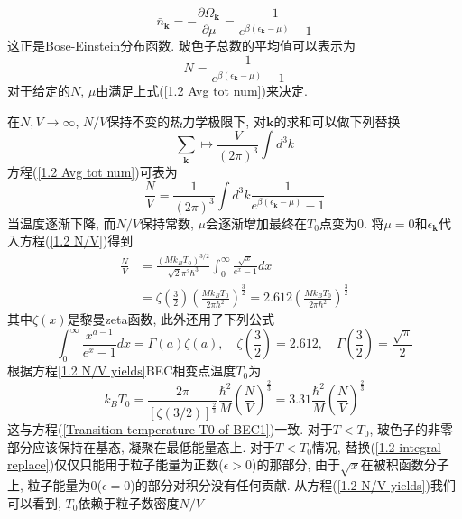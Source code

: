 \documentclass{book}
\begin{document}
\begin{equation}
  \bar{n}_\mathbf{k}=-\frac{\partial\Omega_\mathbf{k}}{\partial\mu}=\frac{1}{e^{\beta(\epsilon_\mathbf{k}-\mu)}-1}
\end{equation}
这正是Bose-Einstein分布函数. 玻色子总数的平均值可以表示为
\begin{equation}\label{1.2 Avg tot num}
  N=\frac{1}{e^{\beta(\epsilon_\mathbf{k}-\mu)}-1}
\end{equation}
对于给定的$N$, $\mu$由满足上式(\eqref{1.2 Avg tot num})来决定.

在$N,V\to\infty$, $N/V$保持不变的热力学极限下, 对$\mathbf{k}$的求和可以做下列替换
\begin{equation}\label{1.2 integral replace}
  \sum_{\mathbf{k}}\longmapsto\frac{V}{(2\pi)^3}\int d^3k
\end{equation}
方程(\eqref{1.2 Avg tot num})可表为
\begin{equation}\label{1.2 N/V}
  \frac{N}{V}=\frac{1}{(2\pi)^3}\int d^3k\frac{1}{e^{\beta(\epsilon_\mathbf{k}-\mu)}-1}
\end{equation}
当温度逐渐下降, 而$N/V$保持常数, $\mu$会逐渐增加最终在$T_0$点变为$0$. 将$\mu=0$和$\epsilon_\mathbf{k}$代入方程(\eqref{1.2 N/V})得到
\begin{equation}\label{1.2 N/V yields}
  \begin{split}
     \frac{N}{V}&=\frac{(Mk_BT_0)^{3/2}}{\sqrt{2}\pi^2\hbar^3}\int_{0}^{\infty}\frac{\sqrt{x}}{e^x-1}dx \\
       &=\zeta\left(\frac{3}{2}\right)\left(\frac{Mk_BT_0}{2\pi\hbar^2}\right)^{\frac{3}{2}}=2.612\left(\frac{Mk_BT_0}{2\pi\hbar^2}\right)^{\frac{3}{2}}
  \end{split}
\end{equation}
其中$\zeta(x)$是黎曼zeta函数, 此外还用了下列公式
\begin{equation}
  \int_{0}^{\infty}\frac{x^{a-1}}{e^x-1}dx=\Gamma(a)\zeta(a),\quad\zeta\left(\frac{3}{2}\right)=2.612,\quad\Gamma\left(\frac{3}{2}\right)=\frac{\sqrt{\pi}}{2}
\end{equation}
根据方程\eqref{1.2 N/V yields}BEC相变点温度$T_0$为
\begin{equation}
  k_BT_0=\frac{2\pi}{\left[\zeta(3/2)\right]^{\frac{2}{3}}}\frac{\hbar^2}{M}\left(\frac{N}{V}\right)^{\frac{2}{3}}=3.31\frac{\hbar^2}{M}\left(\frac{N}{V}\right)^{\frac{2}{3}}
\end{equation}
这与方程(\eqref{Transition temperature T0 of BEC1})一致. 对于$T<T_0$, 玻色子的非零部分应该保持在基态, 凝聚在最低能量态上. 对于$T<T_0$情况, 替换(\eqref{1.2 integral replace})仅仅只能用于粒子能量为正数($\epsilon>0$)的那部分, 由于$\sqrt{x}$在被积函数分子上, 粒子能量为$0$($\epsilon=0$)的部分对积分没有任何贡献. 从方程(\eqref{1.2 N/V yields})我们可以看到, $T_0$依赖于粒子数密度$N/V$
\end{document}
